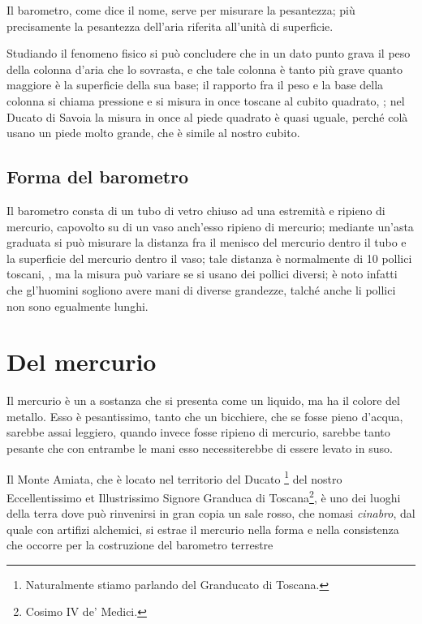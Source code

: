 \documentclass[%
	corpo=11pt,
    twoside,
    stile=classica,
    oldstyle,
    tipotesi=custom,
    greek,
    evenboxes,
]{toptesi}
\begin{document}
{\begin{interlinea}{0.87}
Il barometro, come dice il nome, serve per misurare la pesantezza; pi\`u precisamente la pesantezza dell'aria riferita all'unit\`a di superficie.
\end{interlinea}

\begin{interlinea}{2}
Studiando il fenomeno fisico si pu\`o concludere che in un dato punto grava il peso della colonna d'aria che lo sovrasta, e che tale colonna \`e tanto pi\`u grave quanto maggiore \`e la superficie della sua base; il rapporto fra il peso e la base della colonna si chiama pressione e si misura in once toscane al cubito quadrato, \cite{tor1}; nel Ducato di Savoia la misura in once al piede quadrato \`e quasi uguale, perch\'e col\`a usano un piede molto grande, che \`e simile al nostro cubito.
\end{interlinea}

\subsection{Forma del barometro}
Il barometro consta di un tubo di vetro chiuso ad una estremit\`a e ripieno di mercurio, capovolto su di un vaso anch'esso ripieno di mercurio; mediante un'asta graduata si pu\`o misurare la distanza fra il menisco del mercurio dentro il tubo e la superficie del mercurio dentro il vaso; tale distanza \`e normalmente di 10 pollici toscani, \cite{tor1,tor2}, ma la misura pu\`o variare se si usano dei pollici diversi; \`e noto infatti che gl'huomini sogliono avere mani di diverse grandezze, talch\'e anche li pollici non sono egualmente lunghi.

\section{Del mercurio}
Il mercurio \`e un a sostanza che si presenta come un liquido, ma ha il colore del metallo. Esso \`e pesantissimo, tanto che un bicchiere, che se fosse pieno d'acqua, sarebbe assai leggiero, quando invece fosse ripieno di mercurio, sarebbe tanto pesante che con entrambe le mani esso necessiterebbe di essere levato in suso.


\setcounter{footnote}{25}

Il Monte Amiata, che \`e locato nel territorio del Ducato%
\footnote{Naturalmente stiamo parlando del Granducato di Toscana.%
\ifclassica\NoteWhiteLine\fi
} del nostro Eccellentissimo et Illustrissimo Signore Granduca di Toscana\footnote{Cosimo IV de' Medici.}, \`e uno dei luoghi della terra dove pu\`o rinvenirsi in gran copia un sale rosso, che nomasi \emph{cinabro}, dal quale con artifizi alchemici, si estrae il mercurio nella forma e nella consistenza che occorre per la costruzione del barometro terrestre%
\ifclassica
{}}
\end{document}
